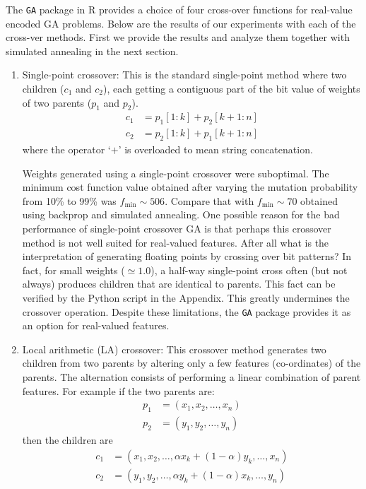 \documentclass[10pt,letterpaper]{article}
\begin{document}
The {\tt GA} package in R provides a choice of four cross-over functions for real-value encoded GA problems. Below are the results of our experiments with each of the cross-ver methods. First we provide the results and analyze them together with simulated annealing in the next section.
%
\begin{enumerate}
\item Single-point crossover:
 This is the standard single-point method where two children ($c_1$ and $c_2$), each getting a contiguous part of the bit value of weights of two parents ($p_1$ and $p_2$). 
\begin{align}
c_1 &= p_1[1 : k] + p_2[k+1 : n] \nonumber \\
c_2 &= p_2[1 : k] + p_1[k+1 : n] \nonumber
\end{align}
where the operator `$+$' is overloaded to mean string concatenation.

Weights generated using a single-point crossover were suboptimal. The minimum cost function value obtained after varying the mutation probability from 10\% to 99\% was $f_{\text{min}}\sim 506$. Compare that with $f_{\text{min}}\sim 70$ obtained using backprop and simulated annealing. One possible reason for the bad performance of single-point crossover GA is that perhaps this crossover method is not well suited for real-valued features. After all what is the interpretation of generating floating points by crossing over bit patterns? In fact, for small weights ($\simeq 1.0$), a half-way single-point cross often (but not always) produces children that are identical to parents. This fact can be verified by the Python script in the Appendix. This greatly undermines the crossover operation. Despite these limitations, the {\tt GA} package provides it as an option for real-valued features. 
\item Local arithmetic (LA) crossover:
 This crossover method generates two children from two parents by altering only a few features (co-ordinates) of the parents. The alternation consists of performing a linear combination of parent features. For example if the two parents are:
\begin{align}
    p_1 &= (x_1, x_2, \ldots, x_n) \nonumber \\
    p_2 &= (y_1, y_2, \ldots, y_n) \nonumber
\end{align}
then the children are
\begin{align}
    c_1 &= (x_1, x_2, \ldots,\alpha x_k + (1-\alpha)y_k, \ldots, x_n) \nonumber \\
    c_2 &= (y_1, y_2, \ldots,\alpha y_k + (1-\alpha)x_k, \ldots, y_n) \nonumber 
\end{align}


\end{enumerate}
\end{document}
